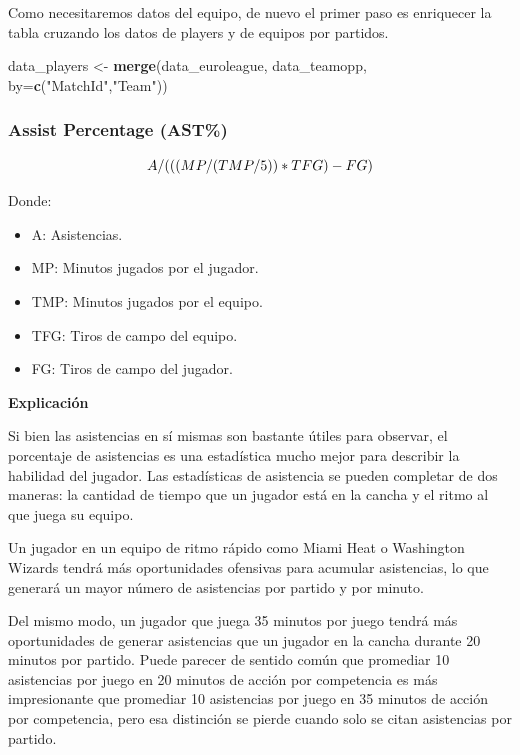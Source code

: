\documentclass[
]{article}
\newenvironment{Shaded}{\begin{snugshade}}{\end{snugshade}}
\newcommand{\DataTypeTok}[1]{\textcolor[rgb]{0.13,0.29,0.53}{#1}}
\newcommand{\KeywordTok}[1]{\textcolor[rgb]{0.13,0.29,0.53}{\textbf{#1}}}
\newcommand{\NormalTok}[1]{#1}
\newcommand{\StringTok}[1]{\textcolor[rgb]{0.31,0.60,0.02}{#1}}
\providecommand{\tightlist}{%
  \setlength{\itemsep}{0pt}\setlength{\parskip}{0pt}}
\begin{document}
Como necesitaremos datos del equipo, de nuevo el primer paso es
enriquecer la tabla cruzando los datos de players y de equipos por
partidos.

\begin{Shaded}
\begin{Highlighting}[]
\NormalTok{data_players <-}\StringTok{ }\KeywordTok{merge}\NormalTok{(data_euroleague, data_teamopp, }\DataTypeTok{by=}\KeywordTok{c}\NormalTok{(}\StringTok{"MatchId"}\NormalTok{,}\StringTok{"Team"}\NormalTok{))}
\end{Highlighting}
\end{Shaded}

\hypertarget{assist-percentage-ast}{%
\subsubsection{Assist Percentage (AST\%)}\label{assist-percentage-ast}}

\[
  \makebox[\linewidth]{$A/(((MP/(TMP/5))*TFG)-FG)$}
\]

Donde:

\begin{itemize}
\tightlist
\item
  A: Asistencias.
\item
  MP: Minutos jugados por el jugador.
\item
  TMP: Minutos jugados por el equipo.
\item
  TFG: Tiros de campo del equipo.
\item
  FG: Tiros de campo del jugador.
\end{itemize}

\textbf{Explicación}

Si bien las asistencias en sí mismas son bastante útiles para observar,
el porcentaje de asistencias es una estadística mucho mejor para
describir la habilidad del jugador. Las estadísticas de asistencia se
pueden completar de dos maneras: la cantidad de tiempo que un jugador
está en la cancha y el ritmo al que juega su equipo.

Un jugador en un equipo de ritmo rápido como Miami Heat o Washington
Wizards tendrá más oportunidades ofensivas para acumular asistencias, lo
que generará un mayor número de asistencias por partido y por minuto.

Del mismo modo, un jugador que juega 35 minutos por juego tendrá más
oportunidades de generar asistencias que un jugador en la cancha durante
20 minutos por partido. Puede parecer de sentido común que promediar 10
asistencias por juego en 20 minutos de acción por competencia es más
impresionante que promediar 10 asistencias por juego en 35 minutos de
acción por competencia, pero esa distinción se pierde cuando solo se
citan asistencias por partido.
\end{document}
